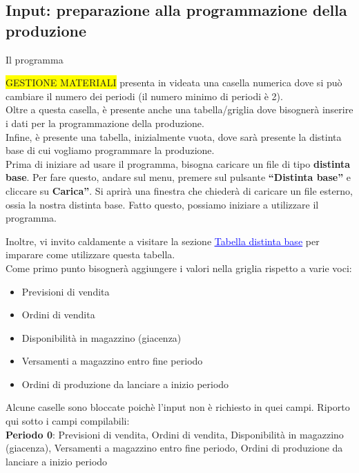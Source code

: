 \documentclass[12pt,twoside]{report}
\begin{document}
\subsection{Input: preparazione alla programmazione della produzione}

\hypertarget{inputProduzione}{Il programma} \colorbox{yellow}{GESTIONE MATERIALI} presenta in videata una casella numerica dove si può cambiare il numero dei periodi (il numero minimo di periodi è 2).\\
Oltre a questa casella, è presente anche una tabella/griglia dove bisognerà inserire i dati per la programmazione della produzione.\\
Infine, è presente una tabella, inizialmente vuota, dove sarà presente la distinta base di cui vogliamo programmare la produzione.\\

Prima di iniziare ad usare il programma, bisogna caricare un file di tipo \textbf{distinta base}. Per fare questo, andare sul menu, premere sul pulsante \textbf{“Distinta base”} e cliccare su \textbf{Carica”}. Si aprirà una finestra che chiederà di caricare un file esterno, ossia la nostra distinta base. Fatto questo, possiamo iniziare a utilizzare il programma.

Inoltre, vi invito caldamente a visitare la sezione \hyperlink{tabDistintaBase}{\textcolor{blue}{\underline{Tabella distinta base}}} per imparare come utilizzare questa tabella.\\

Come primo punto bisognerà aggiungere i valori nella griglia rispetto a varie voci:
\begin{itemize}
	
	\item Previsioni di vendita
	\item Ordini di vendita
	\item Disponibilità in magazzino (giacenza)
	\item Versamenti a magazzino entro fine periodo
	\item Ordini di produzione da lanciare a inizio periodo
	      	
\end{itemize}

Alcune caselle sono bloccate poichè l'input non è richiesto in quei campi.
Riporto qui sotto i campi compilabili:\\

\textbf{Periodo 0}: 
Previsioni di vendita,
Ordini di vendita,
Disponibilità in magazzino (giacenza),
Versamenti a magazzino entro fine periodo,
Ordini di produzione da lanciare a inizio periodo\\
\end{document}
